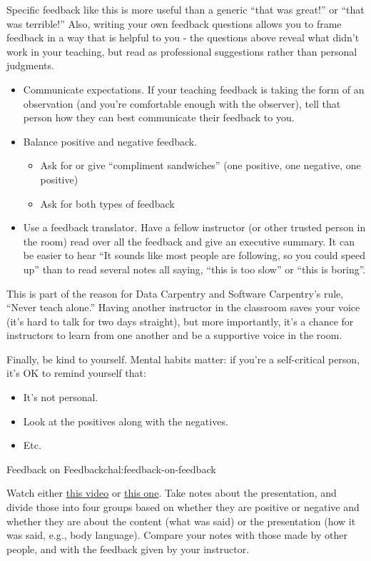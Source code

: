 Specific feedback like this is more useful than a generic ``that was
great!'' or ``that was terrible!'' Also, writing your own feedback
questions allows you to frame feedback in a way that is helpful to you -
the questions above reveal what didn't work in your teaching, but read
as professional suggestions rather than personal judgments.

\begin{itemize}
\item
  Communicate expectations. If your teaching feedback is taking the form
  of an observation (and you're comfortable enough with the observer),
  tell that person how they can best communicate their feedback to you.
\item
  Balance positive and negative feedback.

  \begin{itemize}
    \item
    Ask for or give ``compliment sandwiches'' (one positive, one
    negative, one positive)
  \item
    Ask for both types of feedback
  \end{itemize}
\item
  Use a feedback translator. Have a fellow instructor (or other trusted
  person in the room) read over all the feedback and give an executive
  summary. It can be easier to hear ``It sounds like most people are
  following, so you could speed up'' than to read several notes all
  saying, ``this is too slow'' or ``this is boring''.
\end{itemize}

This is part of the reason for Data Carpentry and Software Carpentry's
rule, ``Never teach alone.'' Having another instructor in the classroom
saves your voice (it's hard to talk for two days straight), but more
importantly, it's a chance for instructors to learn from one another and
be a supportive voice in the room.

Finally, be kind to yourself. Mental habits matter: if you're a
self-critical person, it's OK to remind yourself that:

\begin{itemize}
\item
  It's not personal.
\item
  Look at the positives along with the negatives.
\item
  Etc.
\end{itemize}

\begin{challenge}{Feedback on Feedback}{chal:feedback-on-feedback}

Watch either \href{https://vimeo.com/139316669}{this video} or
\href{https://vimeo.com/139181120}{this one}. Take notes about
the presentation, and divide those into four groups based on whether
they are positive or negative and whether they are about the content
(what was said) or the presentation (how it was said, e.g., body
language). Compare your notes with those made by other people, and with
the feedback given by your instructor.
\end{challenge}

